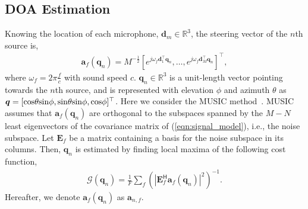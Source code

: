 \documentclass[a4paper]{article}
\def\R{{\mathbb R}}
\begin{document}
\subsection{DOA Estimation}
\label{subsec:doa_estimation}
Knowing the location of each microphone, $\bm{d}_{m} \in \R^{3}$, the steering vector of the $n$th source is,
\begin{align}
  \label{eqn:stv}
    \bm{a}_{f}(\bm{q}_{n}) = M^{-\frac{1}{2}} \left[e^{j\omega_{f}\bm{d}_{1}^\top{} \bm{q}_{n}}, \ldots, e^{j\omega_{f}\bm{d}_{M}^\top{} \bm{q}_{n}} \right]^\top{},
\end{align}
where $\omega_{f}=2\pi\frac{f}{c}$ with sound speed $c$.
$\bm{q}_{n}\in\R^{3}$ is a unit-length vector pointing towards the $n$th source, and is represented with elevation $\phi$ and azimuth $\theta$ as $\bm{q}=[\rm{cos}\theta \rm{sin}\phi, \rm{sin}\theta \rm{sin}\phi, \rm{cos}\phi]^\top{}$.
Here we consider the MUSIC method~\cite{music}.
MUSIC assumes that $\bm{a}_{f}(\bm{q}_n)$ are orthogonal to the subspaces spanned by the $M-N$ least eigenvectors of the covariance matrix of (\ref{eqn:signal_model}), i.e., the noise subspace.
Let $\bm{E}_{f}$ be a matrix containing a basis for the noise subspace in its columns.
Then, $\bm{q}_{n}$ is estimated by finding local maxima of the following cost function,
\begin{align}
  \label{eqn:music_cost}
    \mathcal{G}(\bm{q}_{n}) = \frac{1}{F}\sum\nolimits_{f} (|\bm{E}_{f}^{\mathsf{H}} \bm{a}_{f}(\bm{q}_{n})|^2)^{-1}.
\end{align}
Hereafter, we denote $\bm{a}_{f}(\bm{q}_{n})$ as $\bm{a}_{n,f}$.

\end{document}
